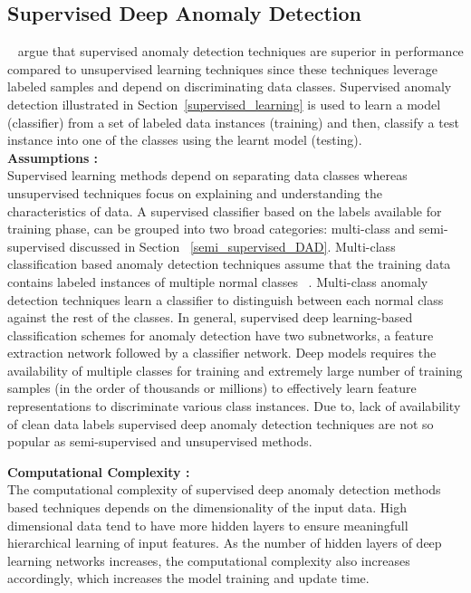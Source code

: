 \subsection{Supervised Deep Anomaly Detection}
\label{sec:supervisedDAD}
~\cite{gornitz2013toward} argue that supervised anomaly detection techniques are superior in performance compared to  unsupervised learning techniques since these techniques leverage labeled samples and depend on discriminating data classes. Supervised anomaly detection illustrated in Section~\ref{supervised_learning} is used to learn a model (classifier) from a set of labeled data instances (training) and then, classify a test instance into one of the classes using the learnt model (testing).\\
\textbf{Assumptions :} \\
Supervised learning methods depend on separating data classes whereas unsupervised
techniques focus on explaining and understanding the characteristics of data. A supervised classifier based on the labels available for training phase, can be grouped into two broad categories: multi-class and semi-supervised discussed in Section ~\ref{semi_supervised_DAD}. Multi-class classification based anomaly detection techniques assume that the training data contains labeled instances of  multiple normal classes ~\cite{shilton2013combined,jumutc2014multi,kim2015deep,erfani2017shared}. Multi-class anomaly detection techniques learn a classifier to distinguish between each normal class against the rest of the classes. In general, supervised deep learning-based classification schemes for anomaly detection have two subnetworks, a feature extraction network followed by a classifier network. Deep models  requires the availability of multiple classes for training and extremely large number of training samples (in the order of thousands or millions) to effectively learn feature representations to discriminate various class instances. Due to, lack of availability of clean data labels supervised deep anomaly detection techniques are not so popular as semi-supervised and unsupervised methods.

\textbf{Computational Complexity :} \\
The computational complexity of supervised deep anomaly detection methods based techniques depends on the dimensionality of the input data. High dimensional data tend to have more hidden layers to ensure meaningfull hierarchical learning of input features. As the number of hidden layers of deep learning networks increases, the computational complexity also increases accordingly, which increases the model training and update time.


